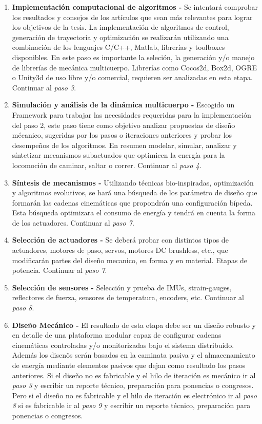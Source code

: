 {\begin{enumerate}
  \item \textbf{Implementaci\'on computacional de algoritmos -} Se intentar\'a comprobar los resultados y consejos de los art\'iculos que sean m\'as relevantes para lograr los objetivos de la tesis. La implementaci\'on de algoritmos de control, generaci\'on de trayectoria y optimizaci\'on se realizar\'an utilizando una combinaci\'on de los lenguajes C/C++, Matlab, librer\'ias y toolboxes disponibles. En este paso es importante la seleci\'on, la generaci\'on y/o manejo de librer\'ias de mec\'anica multicuerpo. Librer\'ias como Cocos2d, Box2d, OGRE o Unity3d de uso libre y/o comercial, requieren ser analizadas en esta etapa. Continuar al \emph{paso 3}.\par
  \item \textbf{Simulaci\'on y an\'alisis de la din\'amica multicuerpo - } Escogido un Framework para trabajar las necesidades requeridas para la implementaci\'on del paso 2, este paso tiene como objetivo analizar propuestas de dise\~no m\'ecanico, sugeridas por los pasos o iteraciones anteriores y probar los desempe\~nos de los algoritmos. En resumen modelar, simular, analizar y s\'intetizar mecanismos subactuados que optimicen la energ\'ia para la locomoci\'on de caminar, saltar o correr. Continuar al \emph{paso 4}.\par
  \item \textbf{S\'intesis de mecanismos - } Utilizando t\'ecnicas bio-inspiradas, optimizaci\'on y algoritmos evolutivos, se har\'a una b\'usqueda de los parámetro de dise\~no que formar\'an las cadenas cinem\'aticas que propondrán una configuraci\'on b\'ipeda. Esta búsqueda optimizara el consumo de energ\'ia y tendrá en cuenta la forma de los actuadores. Continuar al \emph{paso 7}.\par
  \item \textbf{Selecci\'on de actuadores - } Se deber\'a probar con distintos tipos de actuadores, motores de paso, servos, motores DC brushless, etc., que modificar\'an partes del dise\~no mecanico, en forma y en material. Etapas de potencia. Continuar al \emph{paso 7}.\par
  \item \textbf{Selecci\'on de sensores - } Selecci\'on y prueba de IMUs, strain-gauges, reflectores de fuerza, sensores de temperatura, encoders, etc. Continuar al \emph{paso 8}.\par
  \item \textbf{Dise\~no Mec\'anico - } El resultado de esta etapa debe ser un dise\~no robusto y en detalle de una plataforma modular capaz de configurar cadenas cinem\'aticas controladas y/o monitorizadas bajo el sistema distribuido. Adem\'as los disen\~os ser\'an basados en la caminata pasiva y el almacenamiento de energ\'ia mediante elementos pasivos que dejan como resultado los pasos anteriores. Si el dise\~no no es fabricable y el hilo de iteraci\'on es mec\'anico ir al \emph{paso 3} y escribir un reporte t\'ecnico, preparaci\'on para ponencias o congresos. Pero si el dise\~no no es fabricable y el hilo de iteraci\'on es electr\'onico ir al \emph{paso 8} si es fabricable ir al \emph{paso 9} y escribir un reporte t\'ecnico, preparaci\'on para ponencias o congresos.\par

\end{enumerate}}
